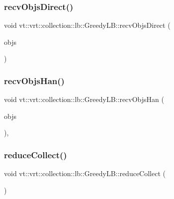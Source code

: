 \subsubsection{\texorpdfstring{recv\+Objs\+Direct()}{recvObjsDirect()}}
{\footnotesize\ttfamily void vt\+::vrt\+::collection\+::lb\+::\+Greedy\+L\+B\+::recv\+Objs\+Direct (\begin{DoxyParamCaption}\item[{\hyperlink{structvt_1_1vrt_1_1collection_1_1lb_1_1_greedy_l_b_types_a201f3d97240fe881e1ed6c0d2cfde262}{Greedy\+L\+B\+Types\+::\+Obj\+I\+D\+Type} $\ast$}]{objs }\end{DoxyParamCaption})\hspace{0.3cm}{\ttfamily [private]}}

\mbox{\label{structvt_1_1vrt_1_1collection_1_1lb_1_1_greedy_l_b_a2590d9a14ee124f30d86557f3cc5fb25}} 
\subsubsection{\texorpdfstring{recv\+Objs\+Han()}{recvObjsHan()}}
{\footnotesize\ttfamily void vt\+::vrt\+::collection\+::lb\+::\+Greedy\+L\+B\+::recv\+Objs\+Han (\begin{DoxyParamCaption}\item[{\hyperlink{structvt_1_1vrt_1_1collection_1_1lb_1_1_greedy_l_b_types_a201f3d97240fe881e1ed6c0d2cfde262}{Greedy\+L\+B\+Types\+::\+Obj\+I\+D\+Type} $\ast$}]{objs }\end{DoxyParamCaption})\hspace{0.3cm}{\ttfamily [static]}, {\ttfamily [private]}}

\mbox{\label{structvt_1_1vrt_1_1collection_1_1lb_1_1_greedy_l_b_afbb460b759e33f8f6e703858d4457cad}} 
\subsubsection{\texorpdfstring{reduce\+Collect()}{reduceCollect()}}
{\footnotesize\ttfamily void vt\+::vrt\+::collection\+::lb\+::\+Greedy\+L\+B\+::reduce\+Collect (\begin{DoxyParamCaption}{ }\end{DoxyParamCaption})\hspace{0.3cm}{\ttfamily [private]}}

